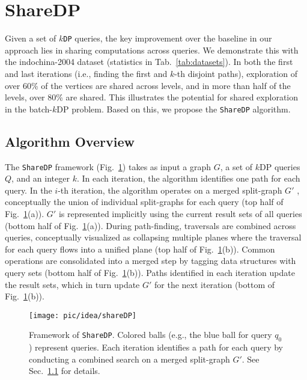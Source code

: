 \section{ShareDP} \label{sec:approach_algo}

Given a set of \texttt{$k$DP} queries, the key improvement over the baseline in our approach lies in sharing computations across queries. 
We demonstrate this with the indochina-2004 dataset (statistics in Tab.~\ref{tab:datasets}). 
In both the first and last iterations (i.e., finding the first and $k$-th disjoint paths), exploration of over 60\% of the vertices are shared across levels, and in more than half of the levels, over 80\% are shared. 
This illustrates the potential for shared exploration in the batch-$k$DP problem. Based on this, we propose the \texttt{ShareDP} algorithm.

\subsection{Algorithm Overview} \label{sec:approach_overview}

The \texttt{ShareDP} framework (Fig.~\ref{fig:shareDP_overview}) takes as input a graph \( G \), a set of $k$DP queries \( Q \), and an integer \( k \). 
In each iteration, the algorithm identifies one path for each query. 
In the \( i \)-th iteration, the algorithm operates on a merged split-graph \( G' \) , 
	conceptually the union of individual split-graphs for each query (top half of Fig.~\ref{fig:shareDP_overview}(a)). 
	\( G' \) is represented implicitly using the current result sets of all queries (bottom half of Fig.~\ref{fig:shareDP_overview}(a)). 
During path-finding, traversals are combined across queries, 
	conceptually visualized as collapsing multiple planes where the traversal for each query flows into a unified plane (top half of Fig.~\ref{fig:shareDP_overview}(b)).
	Common operations are consolidated into a merged step by tagging data structures with query sets (bottom half of Fig.~\ref{fig:shareDP_overview}(b)).  
Paths identified in each iteration update the result sets, which in turn update \( G' \) for the next iteration (bottom of Fig.~\ref{fig:shareDP_overview}(b)). 

\begin{figure}
    \centering
    {\texttt{[image: pic/idea/shareDP]}}
        \caption{Framework of \texttt{ShareDP}. Colored balls (e.g., the blue ball for query \( q_0 \)) represent queries. 
	Each iteration identifies a path for each query 
    by conducting a combined search on a merged split-graph $G'$.
See Sec.~\ref{sec:approach_overview} for details.}
    \label{fig:shareDP_overview}
\end{figure}

